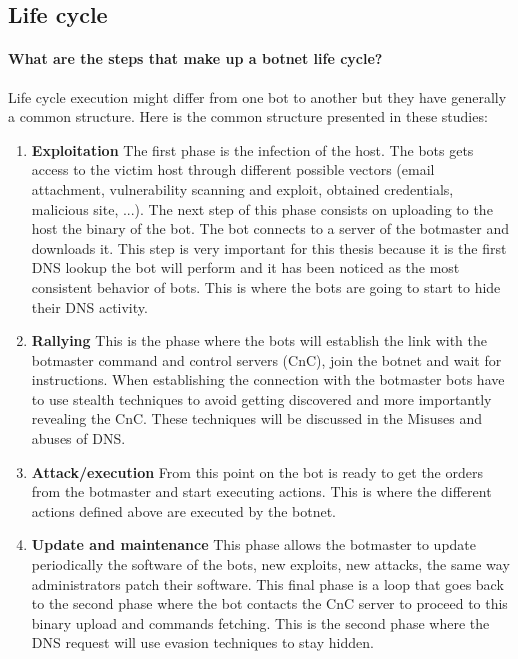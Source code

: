 \subsection{Life cycle}
\paragraph{What are the steps that make up a botnet life cycle?} Life cycle execution might differ from one bot to another but they have generally a common structure. Here is the common structure presented in these studies: 
\cite{survey2}
\cite{survey7}
\cite{survey8}
\cite{survey9}
\begin{enumerate}
\item \textbf{Exploitation} The first phase is the infection of the host. The bots gets access to the victim host through different possible vectors (email attachment, vulnerability scanning and exploit, obtained credentials, malicious site, ...). The next step of this phase consists on uploading to the host the binary of the bot. 
\cite{bot-appr}
The bot connects to a server of the botmaster and downloads it. This step is very important for this thesis because it is the first DNS lookup the bot will perform and it has been noticed as the most consistent behavior of bots. This is where the bots are going to start to hide their DNS activity.
\cite{detection2}
\cite{detection3}
\cite{inside-bot}
\cite{detection4}
\item \textbf{Rallying} This is the phase where the bots will establish the link with the botmaster command and control servers (CnC), join the botnet and wait for instructions. When establishing the connection with the botmaster bots have to use stealth techniques to avoid getting discovered and more importantly revealing the CnC. These techniques will be discussed in the Misuses and abuses of DNS.
\cite{detection5}
\cite{detection6} 
\item \textbf{Attack/execution} From this point on the bot is ready to get the orders from the botmaster and start executing actions. This is where the different actions defined above are executed by the botnet.
\cite{survey10} 
\item \textbf{Update and maintenance}
This phase allows the botmaster to update periodically the software of the bots, new exploits, new attacks, the same way administrators patch their software. This final phase is a loop that goes back to the second phase where the bot contacts the CnC server to proceed to this binary upload and commands fetching. This is the second phase where the DNS request will use evasion techniques to stay hidden.
\cite{detection7}
\end{enumerate}
